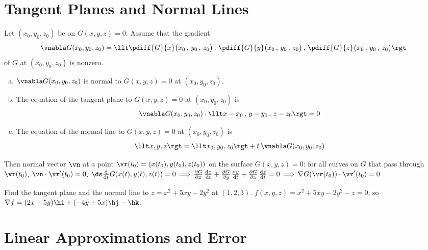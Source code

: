 \section{Tangent Planes and Normal Lines}\label{sec tangent planes}
\begin{theorem}\label{thm tan plane G}
Let $(x_0,y_0,z_0)$ be on $G(x,y,z)=0$. Assume that the gradient
\begin{equation*}
\vnabla G(x_0,y_0,z_0)
= \llt \pdiff{G}{x}\big( x_0\,,\,y_0\,,\,z_0\big)\,,\,
\pdiff{G}{y}\big( x_0\,,\,y_0\,,\,z_0\big)\,,\,
\pdiff{G}{z}\big( x_0\,,\,y_0\,,\,z_0\big)\rgt
\end{equation*}
of $G$ at $(x_0,y_0,z_0)$ is nonzero.
\begin{enumerate}[(a)]
\item
$\vnabla G(x_0,y_0,z_0)$ is normal to $G(x,y,z)=0$ at $(x_0,y_0,z_0)$.
\item
The equation of the tangent plane to $G(x,y,z)=0$ at $(x_0,y_0,z_0)$ is
\begin{equation*}
\vnabla G(x_0,y_0,z_0)\cdot\llt x-x_0\,,\,y-y_0\,,\,z-z_0\rgt =0
\end{equation*}
\item
The equation of the normal line to $G(x,y,z)=0$ at $(x_0,y_0,z_0)$ is
\begin{equation*}
\llt x,y,z \rgt =  \llt x_0,y_0,z_0 \rgt
+t\,\vnabla G(x_0,y_0,z_0)
\end{equation*}
\end{enumerate}
\end{theorem}
Then normal vector $\vn$ at a point $\vr(t_0) = (x(t_0), y(t_0), z(t_0))$ on the surface $G(x, y, z) = 0$: for all curves on $G$ that pass through $\vr(t_0)$, $\vn\cdot\vr'(t_0) = 0$.
$\ds\frac{\text{d}}{\text{d}t}G(x(t), y(t), z(t)) = 0\,\Longrightarrow\,\frac{\partial G}{\partial x}\,\frac{\text{d}x}{\text{d}t} + \frac{\partial G}{\partial y}\,\frac{\text{d}y}{\text{d}t} + \frac{\partial G}{\partial z}\,\frac{\text{d}z}{\text{d}t} = 0\,\Longrightarrow\,\nabla G(\vr(t_0))\cdot\vr'(t_0) = 0$
\begin{eg}\label{eg tan plane C}
Find the tangent plane and the normal line to $z = x^2 + 5xy - 2y^2$ at $(1, 2, 3)$.
\soln
$f(x, y, z) = x^2 + 5xy - 2y^2 - z = 0$, so $\nabla f = (2x + 5y)\hi + (-4y + 5x)\hj - \hk$.
\end{eg}
\section{Linear Approximations and Error}\label{sec lin approx}
